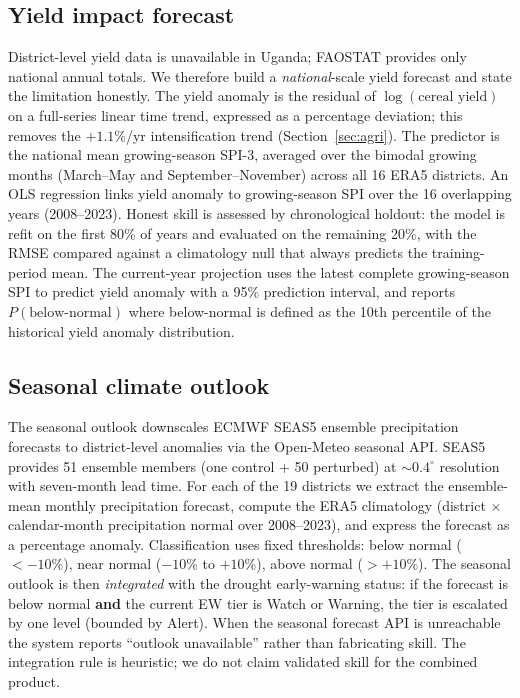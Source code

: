 \documentclass[preprint,12pt]{elsarticle}
\begin{document}
\subsection{Yield impact forecast}\label{sec:yieldf}
District-level yield data is unavailable in Uganda; FAOSTAT provides only
national annual totals. We therefore build a \emph{national}-scale yield
forecast and state the limitation honestly. The yield anomaly is the residual of
$\log(\text{cereal yield})$ on a full-series linear time trend, expressed as a
percentage deviation; this removes the $+1.1\%$/yr intensification trend
(Section~\ref{sec:agri}). The predictor is the national mean growing-season
SPI-3, averaged over the bimodal growing months (March--May and
September--November) across all 16 ERA5 districts. An OLS regression links
yield anomaly to growing-season SPI over the 16 overlapping years
(2008--2023). Honest skill is assessed by chronological holdout: the model is
refit on the first 80\% of years and evaluated on the remaining 20\%, with the
RMSE compared against a climatology null that always predicts the training-period
mean. The current-year projection uses the latest complete growing-season SPI to
predict yield anomaly with a 95\% prediction interval, and reports
$P(\text{below-normal})$ where below-normal is defined as the 10th percentile of
the historical yield anomaly distribution.

\subsection{Seasonal climate outlook}\label{sec:seasonal}
The seasonal outlook downscales ECMWF SEAS5 ensemble precipitation forecasts to
district-level anomalies via the Open-Meteo seasonal API.
SEAS5 provides 51 ensemble members (one control + 50 perturbed) at
${\sim}0.4^{\circ}$ resolution with seven-month lead time. For each of the 19
districts we extract the ensemble-mean monthly precipitation forecast, compute
the ERA5 climatology (district $\times$ calendar-month precipitation normal over
2008--2023), and express the forecast as a percentage anomaly. Classification
uses fixed thresholds: below normal ($< -10\%$), near normal ($-10\%$ to
$+10\%$), above normal ($> +10\%$). The seasonal outlook is then \emph{integrated}
with the drought early-warning status: if the forecast is below normal \textbf{and}
the current EW tier is Watch or Warning, the tier is escalated by one level
(bounded by Alert). When the seasonal forecast API is unreachable the system
reports ``outlook unavailable'' rather than fabricating skill. The integration
rule is heuristic; we do not claim validated skill for the combined product.
\end{document}
